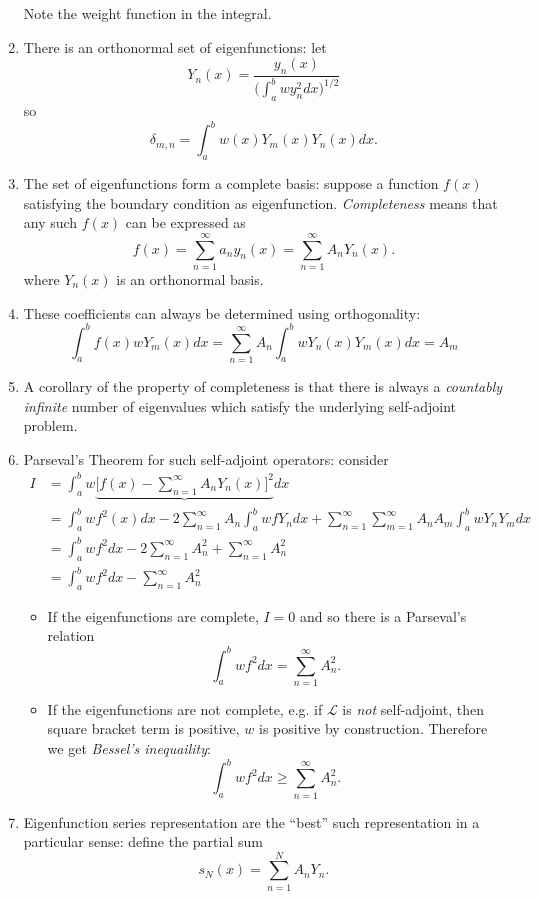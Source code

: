 \documentclass[a4paper]{article}
\renewcommand*{\L}{\mathcal{L}}
\begin{document}
\begin{enumerate}
Note the weight function in the integral.
\item There is an orthonormal set of eigenfunctions: let
  \[
    Y_n(x) = \frac{y_n(x)}{\big(\int_{a}^{b} wy_n^2 dx \big)^{1/2}}
  \]
  so
  \[
\delta_{m,n}=\int_{a}^{b} w(x)Y_m(x)Y_n(x) dx.
  \]
\item The set of eigenfunctions form a complete basis: suppose a function \(f(x)\) satisfying the boundary condition as eigenfunction. \emph{Completeness} means that any such \(f(x)\) can be expressed as
  \[
f(x) = \sum_{n=1}^{\infty}a_ny_n(x) = \sum_{n=1}^{\infty} A_n Y_n(x).
  \]
  where \(Y_n(x)\) is an orthonormal basis.
\item These coefficients can always be determined using orthogonality:
  \[
\int_{a}^{b} f(x)wY_m(x) dx = \sum_{n=1}^{\infty}A_n \int_{a}^{b} wY_n(x)Y_m(x) dx = A_m
\]
\item A corollary of the property of completeness is that there is always a \emph{countably infinite} number of eigenvalues which satisfy the underlying self-adjoint problem.
\item Parseval's Theorem for such self-adjoint operators: consider
  \begin{align*}
    I &= \int_{a}^{b} w \underbrace{\Big[ f(x) - \sum_{n=1}^{\infty}A_nY_n(x) \Big]^2} dx \\
      &= \int_{a}^{b} w f^2(x) dx - 2 \sum_{n=1}^{\infty}A_n \int_{a}^{b} w fY_n dx + \sum_{n=1}^{\infty}\sum_{m=1}^{\infty} A_nA_m \int_{a}^{b} wY_nY_m dx \\
      &=\int_{a}^{b} w f^2 dx -2 \sum_{n=1}^{\infty}A_n^2 + \sum_{n=1}^{\infty}A_n^2 \\
      &= \int_{a}^{b} wf^2 dx - \sum_{n=1}^{\infty} A_n^2
  \end{align*}
  \begin{itemize}
  \item If the eigenfunctions are complete, \(I=0\) and so there is a Parseval's relation
  \[
\int_{a}^{b} wf^2 dx = \sum_{n=1}^{\infty}A_n^2.
  \]
\item If the eigenfunctions are not complete, e.g. if \(\L\) is \emph{not} self-adjoint, then square bracket term is positive, \(w\) is positive by construction. Therefore we get \emph{Bessel's inequaility}:
  \[
\int_{a}^{b} wf^2 dx \geq \sum_{n=1}^{\infty}A_n^2.
  \]
  \end{itemize}
\item Eigenfunction series representation are the ``best'' such representation in a particular sense: define the partial sum
  \[
    s_N(x) = \sum_{n=1}^{N}A_nY_n.
\]
\end{enumerate}
\end{document}

